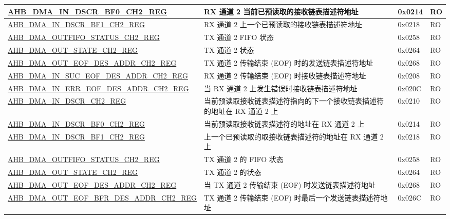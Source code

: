 \begin{longtable}{ | l | l | p{1.3cm} | l | }
\hyperref[regdesc:AHBDMAINDSCRBF0CHNREG]{AHB\_DMA\_IN\_DSCR\_BF0\_CH2\_REG} & RX 通道 2 当前已预读取的接收链表描述符地址 & 0x0214 & RO \\ \hline
\hyperref[regdesc:AHBDMAINDSCRBF1CHNREG]{AHB\_DMA\_IN\_DSCR\_BF1\_CH2\_REG} & RX 通道 2 上一个已预读取的接收链表描述符地址 & 0x0218 & RO \\ \hline
\hyperref[regdesc:AHBDMAOUTFIFOSTATUSCHNREG]{AHB\_DMA\_OUTFIFO\_STATUS\_CH2\_REG} & TX 通道 2 FIFO 状态 & 0x0258 & RO \\ \hline
\hyperref[regdesc:AHBDMAOUTSTATECHNREG]{AHB\_DMA\_OUT\_STATE\_CH2\_REG} & TX 通道 2 状态 & 0x0264 & RO \\ \hline
\hyperref[regdesc:AHBDMAOUTEOFDESADDRCHNREG]{AHB\_DMA\_OUT\_EOF\_DES\_ADDR\_CH2\_REG} & TX 通道 2 传输结束 (EOF) 时的发送链表描述符地址 & 0x0268 & RO \\ \hline
\hyperref[regdesc:AHBDMAINSUCEOFDESADDRCHNREG]{AHB\_DMA\_IN\_SUC\_EOF\_DES\_ADDR\_CH2\_REG} & RX 通道 2 传输结束 (EOF) 时接收链表描述符地址 & 0x0208 & RO \\ \hline
\hyperref[regdesc:AHBDMAINERREOFDESADDRCHNREG]{AHB\_DMA\_IN\_ERR\_EOF\_DES\_ADDR\_CH2\_REG} & 当 RX 通道 2 上发生错误时接收链表描述符地址 & 0x020C & RO \\ \hline
\hyperref[regdesc:AHBDMAINDSCRCHNREG]{AHB\_DMA\_IN\_DSCR\_CH2\_REG} & 当前预读取接收链表描述符指向的下一个接收链表描述符的地址在 RX 通道 2 上 & 0x0210 & RO \\ \hline
\hyperref[regdesc:AHBDMAINDSCRBF0CHNREG]{AHB\_DMA\_IN\_DSCR\_BF0\_CH2\_REG} & 当前预读取接收链表描述符的地址在 RX 通道 2 上 & 0x0214 & RO \\ \hline
\hyperref[regdesc:AHBDMAINDSCRBF1CHNREG]{AHB\_DMA\_IN\_DSCR\_BF1\_CH2\_REG} & 上一个已预读取的取接收链表描述符的地址在 RX 通道 2 上 & 0x0218 & RO \\ \hline
\hyperref[regdesc:AHBDMAOUTFIFOSTATUSCHNREG]{AHB\_DMA\_OUTFIFO\_STATUS\_CH2\_REG} & TX 通道 2 的 FIFO 状态 & 0x0258 & RO \\ \hline
\hyperref[regdesc:AHBDMAOUTSTATECHNREG]{AHB\_DMA\_OUT\_STATE\_CH2\_REG} & TX 通道 2 的状态 & 0x0264 & RO \\ \hline
\hyperref[regdesc:AHBDMAOUTEOFDESADDRCHNREG]{AHB\_DMA\_OUT\_EOF\_DES\_ADDR\_CH2\_REG} & 当 TX 通道 2 传输结束 (EOF) 时发送链表描述符地址 & 0x0268 & RO \\ \hline
\hyperref[regdesc:AHBDMAOUTEOFBFRDESADDRCHNREG]{AHB\_DMA\_OUT\_EOF\_BFR\_DES\_ADDR\_CH2\_REG} & TX 通道 2 传输结束 (EOF) 时最后一个发送链表描述符地址 & 0x026C & RO \\ \hline

\end{longtable}
